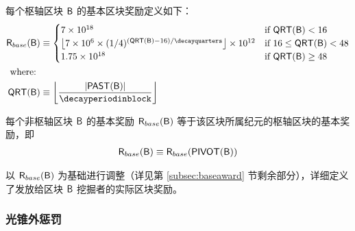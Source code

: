 每个枢轴区块 $\textsf{B}$ 的基本区块奖励定义如下：
	\begin{align}
		\baseaward(\block)&\eqdef
		\begin{cases}
			\initialblockreward \times 10^{18} & \mbox{if $\quarter(\block)<\decaystartinquarter$} \\
			\left\lfloor\initialblockreward \times 10^6 \times (1/4)^{(\quarter(\block)-\decaystartinquarter)/\decayquarters}\right\rfloor\times 10^{12} & \mbox{if $ \decaystartinquarter\le \quarter(\block) < \decayendinquarter$} \\
			\eventualblockreward \times 10^{18} & \mbox{if $\quarter(\block) \ge \decayendinquarter$}
		\end{cases} \\ 
		\mbox{where: }& \\ 
		\quarter(\block) & \eqdef \left\lfloor\frac{|\past(\block)|}{\decayperiodinblock}\right\rfloor
	\end{align}

每个非枢轴区块 $\textsf{B}$ 的基本奖励 $\textsf{R}_{base}(\textsf{B})$ 等于该区块所属纪元的枢轴区块的基本奖励，即
	\begin{align*}
		\textsf{R}_{base}(\textsf{B})\equiv \textsf{R}_{base}(\mathsf{PIVOT}{\left({\textsf{B}} \right)})
	\end{align*}

\name 以 $\textsf{R}_{base}(\textsf{B})$ 为基础进行调整（详见第 \ref{subsec:baseaward} 节剩余部分），详细定义了发放给区块 $\textsf{B}$ 挖掘者的实际区块奖励。



\subsubsection{光锥外惩罚}
\label{subsec:anticone}

